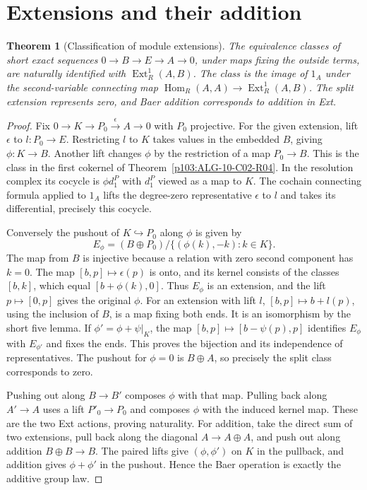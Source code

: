\documentclass[11pt,oneside,openany]{book}
\newtheorem{theorem}{Theorem}[chapter]
\theoremstyle{definition}
\theoremstyle{remark}
\begin{document}
\section{Extensions and their addition}

\begin{theorem}[Classification of module extensions]
\label{p103:ALG-10-C03-S02}
The equivalence classes of short exact sequences
\(0\to B\to E\to A\to0\), under maps fixing the outside terms,
are naturally identified with \(\operatorname{Ext}^1_R(A,B)\).
The class is the image of \(1_A\) under the second-variable
connecting map \(\operatorname{Hom}_R(A,A)\to
\operatorname{Ext}^1_R(A,B)\). The split extension represents
zero, and Baer addition corresponds to addition in Ext.
\end{theorem}

\begin{proof}
Fix \(0\to K\to P_0\xrightarrow{\epsilon}A\to0\) with \(P_0\)
projective. For the given extension, lift \(\epsilon\) to
\(l:P_0\to E\). Restricting \(l\) to \(K\) takes values in the
embedded \(B\), giving \(\phi:K\to B\). Another lift changes
\(\phi\) by the restriction of a map \(P_0\to B\). This is the
class in the first cokernel of
Theorem~\ref{p103:ALG-10-C02-R04}. In the resolution complex its
cocycle is \(\phi d_1^P\) with \(d_1^P\) viewed as a map to \(K\).
The cochain connecting formula applied to \(1_A\) lifts the
degree-zero representative \(\epsilon\) to \(l\) and takes its
differential, precisely this cocycle.

Conversely the pushout of \(K\hookrightarrow P_0\) along \(\phi\) is given by
\[
 E_\phi=(B\oplus P_0)/\{(\phi(k),-k):k\in K\}.
\]
The map from \(B\) is injective because a relation with zero
second component has \(k=0\). The map \([b,p]\mapsto\epsilon(p)\)
is onto, and its kernel consists of the classes \([b,k]\),
which equal \([b+\phi(k),0]\). Thus \(E_\phi\) is an extension,
and the lift \(p\mapsto[0,p]\) gives the original \(\phi\).
For an extension with lift \(l\), \([b,p]\mapsto b+l(p)\),
using the inclusion of \(B\), is a map fixing both ends.
It is an isomorphism by the short five lemma. If
\(\phi'=\phi+\psi|_K\), the map
\([b,p]\mapsto[b-\psi(p),p]\) identifies \(E_\phi\) with
\(E_{\phi'}\) and fixes the ends. This proves the bijection and
its independence of representatives. The pushout for \(\phi=0\)
is \(B\oplus A\), so precisely the split class corresponds to zero.

Pushing out along \(B\to B'\) composes \(\phi\) with that map.
Pulling back along \(A'\to A\) uses a lift \(P'_0\to P_0\) and
composes \(\phi\) with the induced kernel map. These are the
two Ext actions, proving naturality. For addition, take the
direct sum of two extensions, pull back along the diagonal
\(A\to A\oplus A\), and push out along addition \(B\oplus B\to B\).
The paired lifts give \((\phi,\phi')\) on \(K\) in the pullback,
and addition gives \(\phi+\phi'\) in the pushout. Hence the
Baer operation is exactly the additive group law.
\end{proof}
\end{document}
